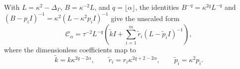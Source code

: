 \documentclass[11pt,a4paper]{article}
\theoremstyle{plain}
\theoremstyle{definition}
\begin{document}
With $L=\kappa^2-\Delta_\Gamma$, $B=\kappa^{-2}L$, and
$q=\lfloor\alpha\rfloor$, the identities
$B^{-q}=\kappa^{2q}L^{-q}$ and
$(B-p_iI)^{-1}=\kappa^2(L-\kappa^2p_iI)^{-1}$ give the unscaled form
\begin{equation}
\mathcal C_\alpha
=\tau^{-2}L^{-q}\left(\widetilde kI
 +\sum_{i=1}^m\widetilde r_i(L-\widetilde p_iI)^{-1}\right),
\label{eq:comparison_cov_operator}
\end{equation}
where the dimensionless coefficients map to
\begin{equation}
\widetilde k=k\kappa^{2q-2\alpha},\qquad
\widetilde r_i=r_i\kappa^{2q+2-2\alpha},\qquad
\widetilde p_i=\kappa^2p_i.
\end{equation}





 
\end{document}
